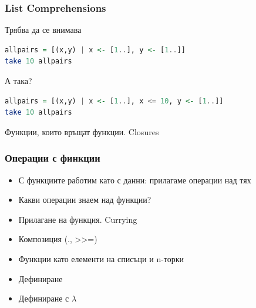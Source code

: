 \documentclass{beamer}
\begin{document}
\begin{frame}[fragile]
  \frametitle{List Comprehensions}

Трябва да се внимава

\bigskip

\begin{lstlisting}[basicstyle=\small,language=Haskell]
allpairs = [(x,y) | x <- [1..], y <- [1..]]
take 10 allpairs
\end{lstlisting}
  
\bigskip

А така?

\begin{lstlisting}[basicstyle=\small,language=Haskell]
allpairs = [(x,y) | x <- [1..], x <= 10, y <- [1..]]
take 10 allpairs
\end{lstlisting}

\end{frame}  

\begin{frame}
  \centerline{Функции, които връщат функции. Closures}
\end{frame}

\begin{frame}[fragile]
  \frametitle{Операции с финкции}

\begin{itemize}
  \item С функциите работим като с данни: прилагаме операции над тях
  \item Какви операции знаем над функции?
\end{itemize}

\bigskip

\begin{itemize}
  \item Прилагане на функция. Currying
  \item Композиция (., >>=)
  \item Функции като елементи на списъци и n-торки
  \item Дефиниране
  \item Дефиниране с $\lambda$
\end{itemize}

\end{frame}
\end{document}
